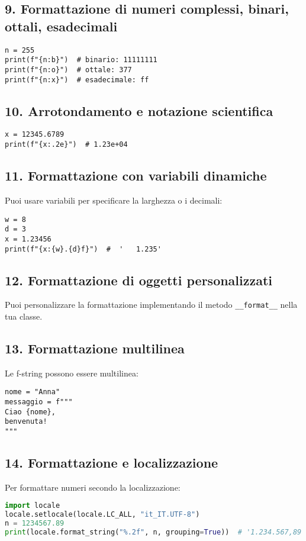 \documentclass[a4paper,12pt]{article}
\begin{document}
\subsection*{9. Formattazione di numeri complessi, binari, ottali, esadecimali}
\begin{lstlisting}
n = 255
print(f"{n:b}")  # binario: 11111111
print(f"{n:o}")  # ottale: 377
print(f"{n:x}")  # esadecimale: ff
\end{lstlisting}

\subsection*{10. Arrotondamento e notazione scientifica}
\begin{lstlisting}
x = 12345.6789
print(f"{x:.2e}")  # 1.23e+04
\end{lstlisting}

\subsection*{11. Formattazione con variabili dinamiche}
Puoi usare variabili per specificare la larghezza o i decimali:
\begin{lstlisting}
w = 8
d = 3
x = 1.23456
print(f"{x:{w}.{d}f}")  #  '   1.235'
\end{lstlisting}

\subsection*{12. Formattazione di oggetti personalizzati}
Puoi personalizzare la formattazione implementando il metodo \texttt{\_\_format\_\_} nella tua classe.

\subsection*{13. Formattazione multilinea}
Le f-string possono essere multilinea:
\begin{lstlisting}
nome = "Anna"
messaggio = f"""
Ciao {nome},
benvenuta!
"""
\end{lstlisting}

\subsection*{14. Formattazione e localizzazione}
Per formattare numeri secondo la localizzazione:
\begin{lstlisting}[language=Python, basicstyle=\ttfamily\footnotesize, breaklines=true, frame=single]
import locale
locale.setlocale(locale.LC_ALL, "it_IT.UTF-8")
n = 1234567.89
print(locale.format_string("%.2f", n, grouping=True))  # '1.234.567,89'
\end{lstlisting}
\end{document}
